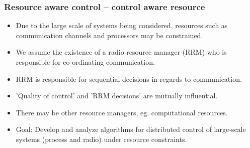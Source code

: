 \documentclass{beamer}
\begin{document}
\begin{frame}
 \frametitle{Resource aware control -- control aware resource}
 \begin{itemize}
  \item Due to the large scale of systems being considered, resources such as communication
  channels and processors may be constrained.
  \item We assume the existence of a radio resource manager (RRM) who is responsible 
  for co-ordinating communication.
  \item RRM is responsible for sequential decisions in regards to communication.
  \item 'Quality of control' and 'RRM decisions' are mutually influential.
  \item There may be other resource managers, eg. computational resources.
  \item {\color{violet} Goal: Develop and analyze algorithms for distributed control of large-scale
  systems (process and radio) under resource constraints.}
 \end{itemize}
\end{frame}
 
\end{document}
